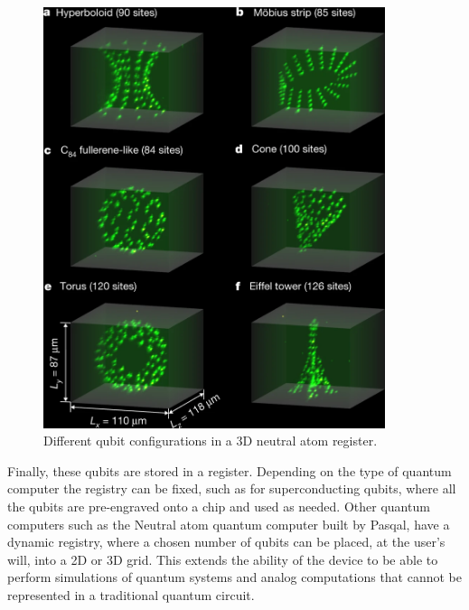\begin{figure}
  \centering
  \includegraphics[width=100mm]{./Images/register3D.png}
  \caption{Different qubit configurations in a 3D neutral atom register. \cite{barredoSyntheticThreedimensionalAtomic2018}} 
  \label{fig:3d register}

\end{figure}
Finally, these qubits are stored in a register. Depending on the type of quantum computer the registry can be fixed, such as for superconducting qubits, where all the qubits 
are pre-engraved onto a chip and used as needed\cite{laddQuantumComputers2010}. Other quantum computers such as the Neutral atom quantum computer built by Pasqal, have a dynamic registry, where a chosen
number of qubits can be placed, at the user's will, into a 2D or 3D grid. This extends the ability of the device to be able to perform simulations of quantum systems and analog
computations that cannot be represented in a traditional quantum circuit.
\\ \\ \\ \\ \\ \\ \\ \\ \\\\

